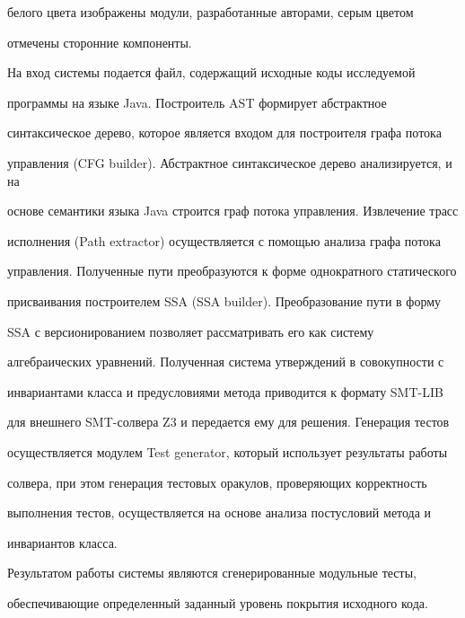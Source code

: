 белого цвета изображены модули, разработанные авторами, серым цветом


отмечены сторонние компоненты.








     На вход системы подается файл, содержащий исходные коды исследуемой


программы на языке Java. Построитель AST формирует абстрактное


синтаксическое дерево, которое является входом для построителя графа потока


управления (CFG builder). Абстрактное синтаксическое дерево анализируется, и на


основе семантики языка Java строится граф потока управления. Извлечение трасс


исполнения (Path extractor) осуществляется с помощью анализа графа потока


управления. Полученные пути преобразуются к форме однократного статического


присваивания построителем SSA (SSA builder). Преобразование пути в форму


SSA с версионированием позволяет рассматривать его как систему


алгебраических уравнений. Полученная система утверждений в совокупности с


инвариантами класса и предусловиями метода приводится к формату SMT-LIB


для внешнего SMT-сол\-ве\-ра Z3 и передается ему для решения. Генерация тестов


осуществляется модулем Test generator, который использует результаты работы


солвера, при этом генерация тестовых оракулов, проверяющих корректность


выполнения тестов, осуществляется на основе анализа постусловий метода и


инвариантов класса.





     Результатом работы системы являются сгенерированные модульные тесты,


обеспечивающие определенный заданный уровень покрытия исходного кода.










